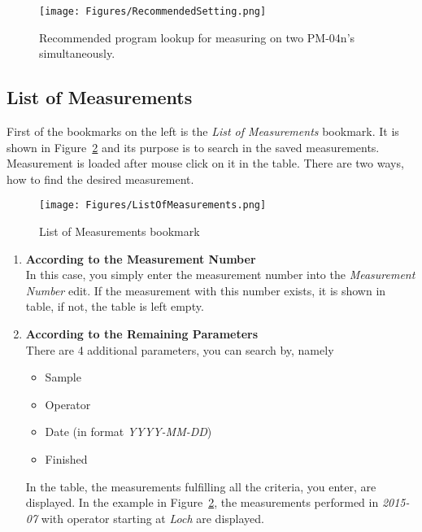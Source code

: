 \documentclass[a4paper,11pt,twoside]{book}
\theoremstyle{named}
\begin{document}
\begin{figure}[t]
  \centering
  \texttt{[image: Figures/RecommendedSetting.png]}
  \caption{Recommended program lookup for measuring on two PM-04n's
  simultaneously.}
  \label{fig:RecommendeSetting}
\end{figure}

\subsection{List of Measurements}
\label{sec:ListOfMeasurements}

First of the bookmarks on the left is the \textit{List of Measurements}
bookmark. It is shown in Figure~\ref{fig:ListOfMeasurements} and its purpose is
to search in the saved measurements. Measurement is loaded after mouse click on
it in the table. There are two ways, how to find the desired measurement.  

\begin{figure}[t]
  \centering
  \texttt{[image: Figures/ListOfMeasurements.png]}
  \caption{List of Measurements bookmark}
  \label{fig:ListOfMeasurements}
\end{figure}

\begin{enumerate}
  \item \textbf{According to the Measurement Number} \\
    In this case, you simply enter the measurement number into the
    \textit{Measurement Number} edit. If the measurement with this number
    exists, it is shown in table, if not, the table is left empty.
  \item \textbf{According to the Remaining Parameters} \\
    There are 4 additional parameters, you can search by, namely
    \begin{itemize}
      \item Sample 
      \item Operator
      \item Date (in format \textit{YYYY-MM-DD})
      \item Finished
    \end{itemize}
    In the table, the measurements fulfilling all the criteria, you enter, are
    displayed. In the example in Figure~\ref{fig:ListOfMeasurements}, the
    measurements performed in \textit{2015-07} with operator starting at
    \textit{Loch} are displayed. 
\end{enumerate}
\end{document}
